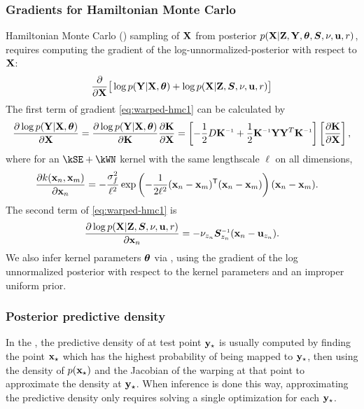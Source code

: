 \subsubsection{Gradients for Hamiltonian Monte Carlo}

Hamiltonian Monte Carlo (\HMC{}) sampling of $\mathbf{X}$ from posterior ${p(\mathbf{X}|\mathbf{Z},\mathbf{Y},\bm{\theta},\bm{S},\nu,{\bf{u}},r)}$, requires computing the gradient of the log-unnormalized-posterior with respect to $\mathbf{X}$:
%
\begin{align}
\frac{\partial }{\partial \mathbf{X}} \big[ \log p(\mathbf{Y}|\mathbf{X},\bm{\theta}) + \log p(\mathbf{X}|\mathbf{Z},\bm{S},\nu,{\bf{u}},r) \big]
\label{eq:warped-hmc1}
\end{align}
%
The first term of gradient \eqref{eq:warped-hmc1} can be calculated by
%
\begin{align}
\pderiv{\log p(\vY | \vX,\bm{\theta})}{\vX} =  \pderiv{\log p(\vY | \vX,\bm{\theta})}{\vK} \pderiv{\vK}{\vX} = \left[ -\frac{1}{2}D\vK\inv+\frac{1}{2}\vK\inv \vY \vY^{T} \vK\inv \right]\left[\pderiv{\vK}{\vX}\right],
\label{eq:warped-hmc2}
\end{align}
%
where for an $\kSE + \kWN$ kernel with the same lengthscale $\ell$ on all dimensions,
%
\begin{align}
\frac{\partial k({\bf{x}}_{n},{\bf{x}}_{m})}{\partial {\bf{x}}_n}
 & = -\frac{\sigma^2_f}{\ell^2} \exp \left( - \frac{1}{2 \ell^2} ({\bf{x}}_n - {\bf{x}}_m)^{\mathsf{T}} ({\bf{x}}_n - {\bf{x}}_m) \right) ({\bf{x}}_n - {\bf{x}}_m).
 \label{eq:warped-hmc3}
\end{align}
%
The second term of \eqref{eq:warped-hmc1} is
\begin{align}
\frac{\partial \log p(\vX|\vZ,\bm{S},\nu,\vu,r)}{\partial \vx_{n}} 
= -\nu_{z_{n}}\bm{S}_{z_{n}}\inv(\vx_{n}-\vu_{z_{n}}).
\label{eq:warped-hmc4}
\end{align}
We also infer kernel parameters ${\boldsymbol{\theta}}$ via \HMC{}, using the gradient of the log unnormalized posterior with respect to the kernel parameters and an improper uniform prior.




\subsubsection{Posterior predictive density}
\label{sec:iwmm-predictive-density}

In the \gplvm{}, the predictive density of at test point ${\bf{y}}_\star$ is usually computed by finding the point ${\bf{x}}_\star$ which has the highest probability of being mapped to ${\bf{y}}_\star$, then using the density of $p({\bf{x}}_\star)$ and the Jacobian of the warping at that point to approximate the density at ${\bf{y}}_\star$.
When inference is done this way, approximating the predictive density only requires solving a single optimization for each ${\bf{y}}_\star$.  


